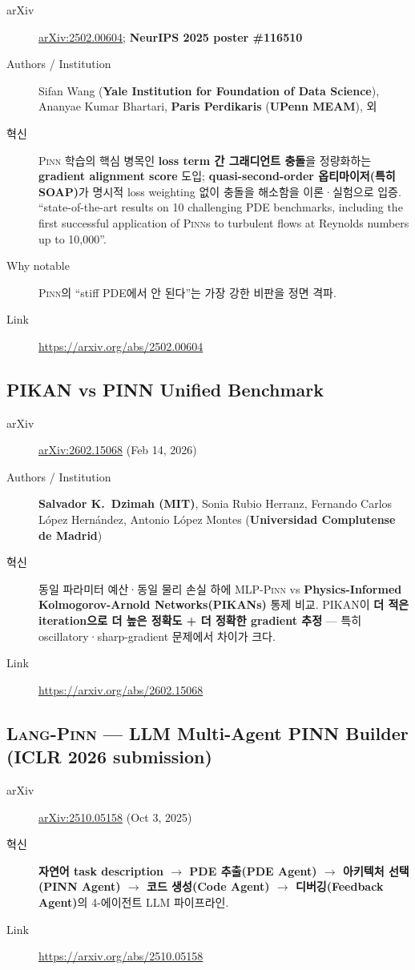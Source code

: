 \documentclass[11pt,a4paper,oneside]{report}
\newcommand{\pinn}{\textsc{Pinn}}
\newcommand{\langpinn}{\textsc{Lang-Pinn}}
\newcommand{\arxivid}[1]{\href{https://arxiv.org/abs/#1}{arXiv:#1}}
\begin{document}
\begin{description}
\item[arXiv] \arxivid{2502.00604}; \textbf{NeurIPS 2025 poster \#116510}
\item[Authors / Institution] Sifan Wang (\textbf{Yale Institution for Foundation of Data Science}), Ananyae Kumar Bhartari, \textbf{Paris Perdikaris} (\textbf{UPenn MEAM}), 외
\item[혁신] \pinn{} 학습의 핵심 병목인 \textbf{loss term 간 그래디언트 충돌}을 정량화하는 \textbf{gradient alignment score} 도입; \textbf{quasi-second-order 옵티마이저(특히 SOAP)}가 명시적 loss weighting 없이 충돌을 해소함을 이론·실험으로 입증. ``state-of-the-art results on 10 challenging PDE benchmarks, including the first successful application of \pinn{}s to turbulent flows at Reynolds numbers up to 10{,}000''.
\item[Why notable] \pinn{}의 ``stiff PDE에서 안 된다''는 가장 강한 비판을 정면 격파.
\item[Link] \url{https://arxiv.org/abs/2502.00604}
\end{description}

\subsection{PIKAN vs PINN Unified Benchmark}

\begin{description}
\item[arXiv] \arxivid{2602.15068} (Feb 14, 2026)
\item[Authors / Institution] \textbf{Salvador K.\ Dzimah (MIT)}, Sonia Rubio Herranz, Fernando Carlos López Hernández, Antonio López Montes (\textbf{Universidad Complutense de Madrid})
\item[혁신] 동일 파라미터 예산·동일 물리 손실 하에 MLP-\pinn{} vs \textbf{Physics-Informed Kolmogorov-Arnold Networks(PIKANs)} 통제 비교. PIKAN이 \textbf{더 적은 iteration으로 더 높은 정확도 + 더 정확한 gradient 추정} --- 특히 oscillatory·sharp-gradient 문제에서 차이가 크다.
\item[Link] \url{https://arxiv.org/abs/2602.15068}
\end{description}

\subsection{\langpinn{} --- LLM Multi-Agent PINN Builder (ICLR 2026 submission)}

\begin{description}
\item[arXiv] \arxivid{2510.05158} (Oct 3, 2025)
\item[혁신] \textbf{자연어 task description $\rightarrow$ PDE 추출(PDE Agent) $\rightarrow$ 아키텍처 선택(PINN Agent) $\rightarrow$ 코드 생성(Code Agent) $\rightarrow$ 디버깅(Feedback Agent)}의 4-에이전트 LLM 파이프라인.
\item[Link] \url{https://arxiv.org/abs/2510.05158}
\end{description}
\end{document}

